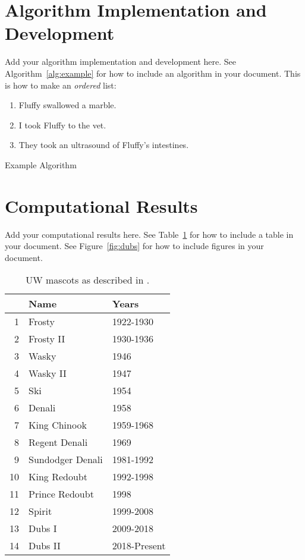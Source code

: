 \documentclass{article}
\begin{document}
\section{Algorithm Implementation and Development}
Add your algorithm implementation and development here. See Algorithm~\ref{alg:example} for how to include an algorithm in your document. This is how to make an \textit{ordered} list:
\begin{enumerate}
    \item Fluffy swallowed a marble.
    \item I took Fluffy to the vet.
    \item They took an ultrasound of Fluffy's intestines.
\end{enumerate}

\begin{algorithm}
\begin{algorithmic}
    \ENDFOR
    \ELSE
        \ENDIF
    \ENDIF 
\end{algorithmic}
\caption{Example Algorithm}
\label{alg:example}
\end{algorithm}

\section{Computational Results}
Add your computational results here. See Table~\ref{tab:mascots} for how to include a table in your document. See Figure~\ref{fig:dubs} for how to include figures in your document.

\begin{table}
    \centering
    \begin{tabular}{rll}
    & Name & Years \\
    \hline
    1 & Frosty & 1922-1930  \\
    2 & Frosty II & 1930-1936 \\
    3 & Wasky & 1946 \\
    4 & Wasky II & 1947 \\
    5 & Ski & 1954 \\
    6 & Denali & 1958 \\
    7 & King Chinook & 1959-1968\\
    8 & Regent Denali & 1969 \\
    9 & Sundodger Denali & 1981-1992 \\
    10 & King Redoubt & 1992-1998 \\
    11 & Prince Redoubt & 1998 \\
    12 & Spirit & 1999-2008 \\
    13 & Dubs I & 2009-2018 \\
    14 & Dubs II & 2018-Present
    \end{tabular}
    \caption{UW mascots as described in \cite{washington_huskies}.}
    \label{tab:mascots}
\end{table}
\end{document}

